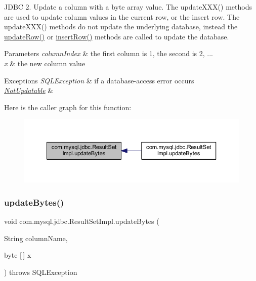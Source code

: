 J\+D\+BC 2. Update a column with a byte array value. The update\+X\+X\+X() methods are used to update column values in the current row, or the insert row. The update\+X\+X\+X() methods do not update the underlying database, instead the \mbox{\hyperlink{classcom_1_1mysql_1_1jdbc_1_1_result_set_impl_a2842d32292d023aaeeafedeed3322981}{update\+Row()}} or \mbox{\hyperlink{classcom_1_1mysql_1_1jdbc_1_1_result_set_impl_a78e304e3279cbcf60392f18c1385e3bf}{insert\+Row()}} methods are called to update the database.


\begin{DoxyParams}{Parameters}
{\em column\+Index} & the first column is 1, the second is 2, ... \\
\hline
{\em x} & the new column value\\
\hline
\end{DoxyParams}

\begin{DoxyExceptions}{Exceptions}
{\em S\+Q\+L\+Exception} & if a database-\/access error occurs \\
\hline
{\em \mbox{\hyperlink{classcom_1_1mysql_1_1jdbc_1_1_not_updatable}{Not\+Updatable}}} & \\
\hline
\end{DoxyExceptions}
Here is the caller graph for this function\+:
\nopagebreak
\begin{figure}[H]
\begin{center}
\leavevmode
\includegraphics[width=350pt]{classcom_1_1mysql_1_1jdbc_1_1_result_set_impl_ad8cd4a78e2a5df6084ee649f05cc83eb_icgraph}
\end{center}
\end{figure}
\mbox{\label{classcom_1_1mysql_1_1jdbc_1_1_result_set_impl_a187964b00b0acfd59bb49bf015c3911e}} 
\subsubsection{\texorpdfstring{update\+Bytes()}{updateBytes()}\hspace{0.1cm}{\footnotesize\ttfamily [2/2]}}
{\footnotesize\ttfamily void com.\+mysql.\+jdbc.\+Result\+Set\+Impl.\+update\+Bytes (\begin{DoxyParamCaption}\item[{String}]{column\+Name,  }\item[{byte \mbox{[}$\,$\mbox{]}}]{x }\end{DoxyParamCaption}) throws S\+Q\+L\+Exception}

